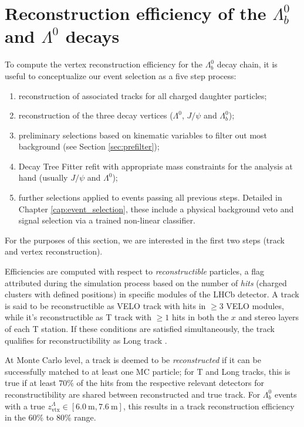\section{Reconstruction efficiency of the \texorpdfstring{$\Lambda^0_b$}{Lambdab} and \texorpdfstring{$\Lambda^0$}{Lambda} decays}

To compute the vertex reconstruction efficiency for the $\Lambda_b^0$ decay chain, it is useful to conceptualize our event selection as a five step process:
\begin{enumerate}
	\item reconstruction of associated tracks for all charged daughter particles;
	\item reconstruction of the three decay vertices ($\Lambda^0$, $J/\psi$ and $\Lambda_b^0$);
	\item preliminary selections based on kinematic variables to filter out most background (see Section \ref{sec:prefilter});
	\item Decay Tree Fitter refit with appropriate mass constraints for the analysis at hand (usually $J/\psi$ and $\Lambda^0$);
	\item further selections applied to events passing all previous steps. Detailed in Chapter \ref{cap:event_selection}, these include a physical background veto and signal selection via a trained non-linear classifier.
\end{enumerate}

For the purposes of this section, we are interested in the first two steps (track and vertex reconstruction).

Efficiencies are computed with respect to \textit{reconstructible} particles, a flag attributed during the simulation process based on the number of \textit{hits} (charged clusters with defined positions) in specific modules of the LHCb detector.
A track is said to be reconstructible as VELO track with hits in $\geq 3$ VELO modules, while it's reconstructible as T track with $\geq 1$ hits in both the $x$ and stereo layers of each T station.
If these conditions are satisfied simultaneously, the track qualifies for reconstructibility as Long track \cite{Li:2752971}.

At Monte Carlo level, a track is deemed to be \textit{reconstructed} if it can be successfully matched to at least one MC particle;
for T and Long tracks, this is true if at least $70\%$ of the hits from the respective relevant detectors for reconstructibility are shared between reconstructed and true track. For $\Lambda^0_b$ events with a true $z_\text{vtx}^\Lambda \in [\SI{6.0}{\meter}, \SI{7.6}{\meter}]$, this results in a track reconstruction efficiency in the 60\% to 80\% range.

